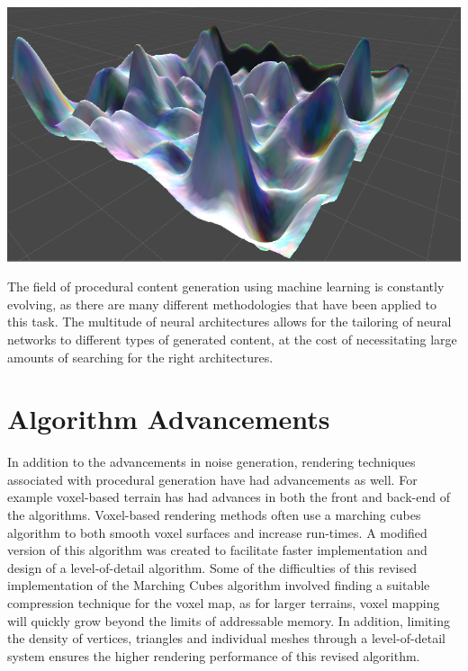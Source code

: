 \documentclass[10pt]{report}
\begin{document}
		\begin{minipage}{\textwidth}
			\centering
			\includegraphics[scale=.3]{rolling}
			\label{fig:dl-noise}
		\end{minipage}
	
		The field of procedural content generation using machine learning is constantly evolving, as there are many different methodologies that have been applied to this task. The multitude of neural architectures allows for the tailoring of neural networks to different types of generated content, at the cost of necessitating large amounts of searching for the right architectures.
		
		\cite{Liu_2020}
		
		\section{Algorithm Advancements} 
		
		In addition to the advancements in noise generation, rendering techniques associated with procedural generation have had advancements as well. For example voxel-based terrain has had advances in both the front and back-end of the algorithms. Voxel-based rendering methods often use a marching cubes algorithm to both smooth voxel surfaces and increase run-times. A modified version of this algorithm was created to facilitate faster implementation and design of a level-of-detail algorithm. Some of the difficulties of this revised implementation of the Marching Cubes algorithm involved finding a suitable compression technique for the voxel map, as for larger terrains, voxel mapping will quickly grow beyond the limits of addressable memory. In addition, limiting the density of vertices, triangles and individual meshes through a level-of-detail system ensures the higher rendering performance of this revised algorithm. 
		
\end{document}
